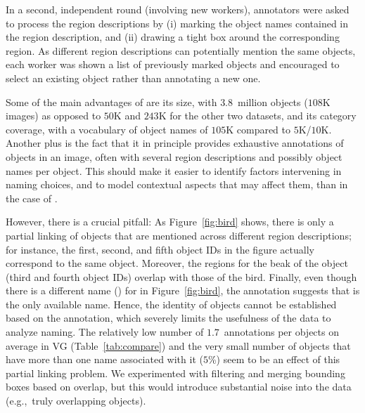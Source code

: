 In a second, independent round (involving new workers), annotators were asked to process the region descriptions by (i) marking the object names contained in the region description, and (ii) drawing a tight box around the corresponding region. As different region descriptions can potentially mention the same objects, each worker was shown a list of previously marked objects and encouraged to select an existing object rather than annotating a new one.


Some of the main advantages of \vg are its size, with $3.8$~million objects ($108$K images) as opposed to $50$K and $243$K for the other two datasets, and its category coverage, with a vocabulary of object names of $105$K compared to $5$K/$10$K.
Another plus is the fact that it in principle provides exhaustive annotations of objects in an image, often with several region descriptions and possibly object names per object.
This should make it easier to identify factors intervening in naming choices, and to model contextual aspects that may affect them, than in the case of .

However, there is a crucial pitfall: As Figure~\ref{fig:bird} shows, there is only a partial linking of objects that are mentioned across different region descriptions; for instance, the first, second, and fifth object IDs in the figure actually correspond to the same object.
Moreover, the regions for the beak of the object (third and fourth object IDs) overlap with those of the bird.
Finally, even though there is a different name () for  in Figure~\ref{fig:bird}, the annotation suggests that  is the only available name. 
Hence, the identity of objects cannot be established based on the annotation, which severely limits the usefulness of the data to analyze naming.
The relatively low number of $1.7$~annotations per objects on average in VG (Table~\ref{tab:compare}) and the very small number of objects that have more than one name associated with it ($5$\%) seem to be an effect of this partial linking problem.
We experimented with filtering and merging bounding boxes based on overlap, but this would introduce substantial noise into the data (e.g.,~truly overlapping objects).

